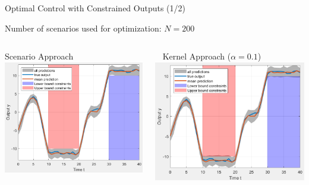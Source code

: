 \documentclass[student, noshadow, itr, english, aspectratio=169]{ITR_LSR_slides}
\begin{document}
\begin{frame}{Optimal Control with Constrained Outputs (1/2)}

Number of scenarios used for optimization: $N = 200$
\vspace{.3cm}
\begin{columns}[onlytextwidth, T]
		\begin{column}{.5\textwidth}
			\;\; Scenario Approach
			\includegraphics[width= .9\textwidth]{Scenario_plot}
		\end{column}
		\begin{column}{.5\textwidth}
			$\;\;$ Kernel Approach  ($\alpha = 0.1$)
			\includegraphics[width=.9\textwidth]{Kernel_plot}
		\end{column}
	\end{columns}\vspace{.5cm}
\end{frame}	
\end{document}

